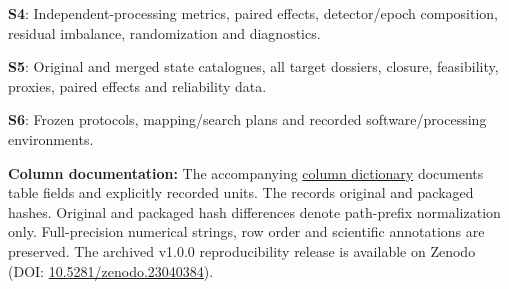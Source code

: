 \documentclass[final,5p,authoryear,nopreprintline]{elsarticle}
\begin{document}
\noindent\textbf{S4}: Independent-processing metrics, paired effects, detector/epoch composition, residual imbalance, randomization and diagnostics.\par\smallskip

\noindent\textbf{S5}: Original and merged state catalogues, all target dossiers, closure, feasibility, proxies, paired effects and reliability data.\par\smallskip

\noindent\textbf{S6}: Frozen protocols, mapping/search plans and recorded software/processing environments.\par\smallskip

\noindent\textbf{Column documentation:} The accompanying \href{https://github.com/YouhanCW/bhns-source-generalization/blob/3c5bb50b1820ef89f816fc2f4da0fb6c69f359f7/manuscript/supplement/tables/column_dictionary.csv}{column dictionary} documents table fields and explicitly recorded units. The  records original and packaged hashes. Original and packaged hash differences denote path-prefix normalization only. Full-precision numerical strings, row order and scientific annotations are preserved. The archived v1.0.0 reproducibility release is available on Zenodo (DOI: \href{https://doi.org/10.5281/zenodo.23040384}{10.5281/zenodo.23040384}).


\end{document}
